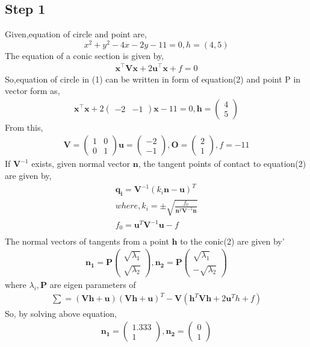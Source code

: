 \documentclass[journal,10pt,twocolumn]{article}
\let\vec\mathbf
\newcommand{\myvec}[1]{\ensuremath{\begin{pmatrix}#1\end{pmatrix}}}
\begin{document}
\subsection*{Step 1}
\large{Given,equation of circle and point are,} 
   \begin{equation}
   x^2+y^2-4x-2y-11=0, h=(4,5)
   \end{equation}
   \large{The equation of a conic section is given by,}
   \begin{align}
   \vec{x}^{\top}\vec{V}\vec{x}+2\vec{u}^{\top}\vec{x}+f=0
   \end{align}
   \large{So,equation of circle in (1) can be written in form of equation(2) and point P in vector form as,}
   \begin{align}
   \vec{x}^{\top}\vec{x}+2\myvec{-2&-1}\vec{x}-11=0, \vec{h}=\myvec{4\\5}
   \end{align}
   From this,
   \begin{align}
   \vec{V}=\myvec{1&0\\0&1}\vec{u}=\myvec{-2\\-1}, \vec{O}=\myvec{2\\1}, f=-11
   \end{align}
   \large{If $\vec{V}^{-1}$ exists, given normal vector $\vec{n}$, the tangent points of contact to equation(2) are given by,}
\begin{align}
\vec{q_i}=\vec{V}^{-1}(k_i\vec{n}-\vec{u})^T \\
where,k_i=\pm \sqrt{\frac{f_0}{\vec{n}^T\vec{V}^{-1}\vec{n}}}\\
f_0=\vec{u}^T\vec{V}^{-1}\vec{u}-f\\
\end{align}  
 The normal vectors of tangents from a point $\vec{h}$ to the conic(2) are given by'
   \begin{align}
   \vec{n_1}=\vec{P}\myvec{\sqrt{\lambda_1}\\ \sqrt{\lambda_2}},\vec{n_2}=\vec{P}\myvec{\sqrt{\lambda_1}\\ -\sqrt{\lambda_2}}
   \end{align}
where $\lambda_i,\vec{P}$ are eigen parameters of 
\begin{align}
\sum=(\vec{V}\vec{h}+\vec{u})(\vec{V}\vec{h}+\vec{u})^T-\vec{V}(\vec{h}^T\vec{V}\vec{h}+2\vec{u}^Th+f)
\end{align}
   So, by solving above equation,
   \begin{align}
   \vec{n_1}=\myvec{1.333\\1},\vec{n_2}=\myvec{0\\1}
   \end{align} 
\end{document}
